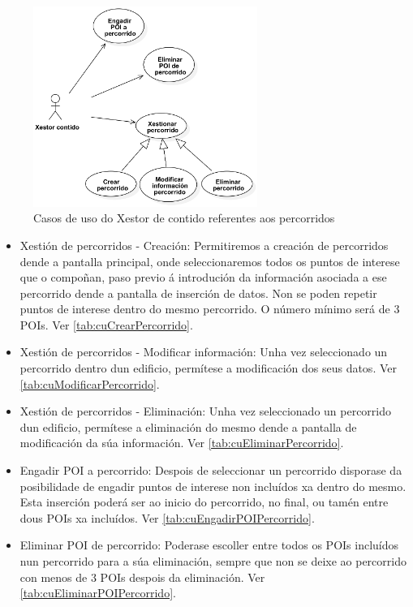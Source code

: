 \begin{figure}[tbp]
	\begin{center}
		\includegraphics[width=0.65\textwidth]{figures/CasosUso/XestorContidoPercorrido}
		\caption{Casos de uso do Xestor de contido referentes aos percorridos}
		\label{fig:cuXestorContidoPercorrido}
	\end{center}
\end{figure}

\begin{itemize}
	\item Xestión de percorridos - Creación: Permitiremos a creación de percorridos dende a pantalla principal, onde seleccionaremos todos os puntos de interese que o compoñan, paso previo á introdución da información asociada a ese percorrido dende a pantalla de inserción de datos. Non se poden repetir puntos de interese dentro do mesmo percorrido. O número mínimo será de 3 POIs. Ver \ref{tab:cuCrearPercorrido}.
	\item Xestión de percorridos - Modificar información: Unha vez seleccionado un percorrido dentro dun edificio, permítese a modificación dos seus datos. Ver \ref{tab:cuModificarPercorrido}.
	\item Xestión de percorridos - Eliminación: Unha vez seleccionado un percorrido dun edificio, permítese a eliminación do mesmo dende a pantalla de modificación da súa información. Ver \ref{tab:cuEliminarPercorrido}.
	\item Engadir POI a percorrido: Despois de seleccionar un percorrido disporase da posibilidade de engadir puntos de interese non incluídos xa dentro do mesmo. Esta inserción poderá ser ao inicio do percorrido, no final, ou tamén entre dous POIs xa incluídos. Ver \ref{tab:cuEngadirPOIPercorrido}.
	\item Eliminar POI de percorrido: Poderase escoller entre todos os POIs incluídos nun percorrido para a súa eliminación, sempre que non se deixe ao percorrido con menos de 3 POIs despois da eliminación. Ver \ref{tab:cuEliminarPOIPercorrido}.
\end{itemize}


